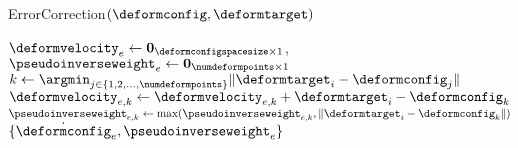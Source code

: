 \begin{algorithm}[t]
    \caption{ErrorCorrection$(\deformconfig, \deformtarget)$}
    \begin{algorithmic}[1]
        \State $\deformvelocity_e \gets \boldsymbol 0_{\deformconfigspacesize \times 1}$, $\pseudoinverseweight_e \gets \boldsymbol 0_{\numdeformpoints \times 1}$
            \State $k \gets \argmin_{j \in \{ 1,2,\dots,\numdeformpoints \}} \| \deformtarget_i - \deformconfig_j \|$
            \State $\deformvelocity_{e,k} \gets \deformvelocity_{e,k} + \deformtarget_i - \deformconfig_k$
            \State $\pseudoinverseweight_{e,k} \gets \max (\pseudoinverseweight_{e,k}, \| \deformtarget_i - \deformconfig_k \|)$
        \EndFor
        \State \Return $\{ \dot \deformconfig_e, \pseudoinverseweight_e \}$
    \end{algorithmic}
    \label{alg:error_correction}
\end{algorithm}